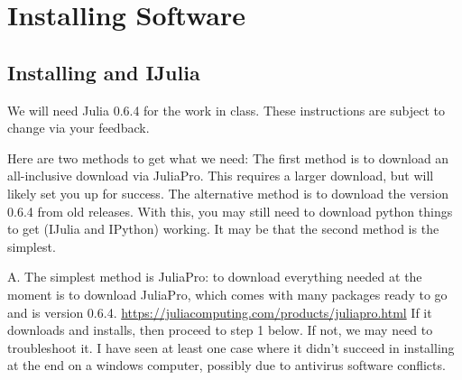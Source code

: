 \chapter{Installing Software}

\section{Installing \protect\julia and IJulia}
We will need Julia 0.6.4 for the work in class.
These instructions are subject to change via your feedback.


Here are two methods to get what we need:  
The first method is to download an all-inclusive download via JuliaPro.   This requires a larger download, but will likely set you up for success.  The alternative method is to download the version 0.6.4 from old releases.  With this, you may still need to download python things to get \jupyter (IJulia and IPython) working.  It may be that the second method is the simplest.

A.	 The simplest method is JuliaPro:  to download everything needed at the moment is to download JuliaPro, which comes with many packages ready to go and is version 0.6.4.
\url{https://juliacomputing.com/products/juliapro.html}
If it downloads and installs, then proceed to step 1 below.  If not, we may need to troubleshoot it.  I have seen at least one case where it didn't succeed in installing at the end on a windows computer, possibly due to antivirus software conflicts.

